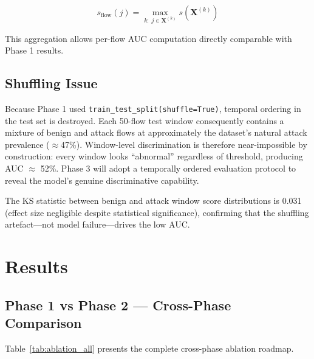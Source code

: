 \documentclass[conference]{IEEEtran}
\begin{document}
\begin{equation}
  s_\text{flow}(j) = \max_{k:\; j \in \mathbf{X}^{(k)}} s\!\left(\mathbf{X}^{(k)}\right)
\end{equation}

This aggregation allows per-flow AUC computation directly comparable with Phase 1 results.

\subsection{Shuffling Issue}
\label{sec:shuffling}

Because Phase 1 used \texttt{train\_test\_split(shuffle=True)}, temporal ordering in the test
set is destroyed. Each 50-flow test window consequently contains a mixture of benign and attack
flows at approximately the dataset's natural attack prevalence ($\approx$47\%). Window-level
discrimination is therefore near-impossible by construction: every window looks ``abnormal''
regardless of threshold, producing AUC $\approx$ 52\%. Phase 3 will adopt a temporally ordered
evaluation protocol to reveal the model's genuine discriminative capability.

The KS statistic between benign and attack window score distributions is 0.031 (effect size
negligible despite statistical significance), confirming that the shuffling artefact—not model
failure—drives the low AUC.

\section{Results}

\subsection{Phase 1 vs Phase 2 — Cross-Phase Comparison}

Table~\ref{tab:ablation_all} presents the complete cross-phase ablation roadmap.
\end{document}
